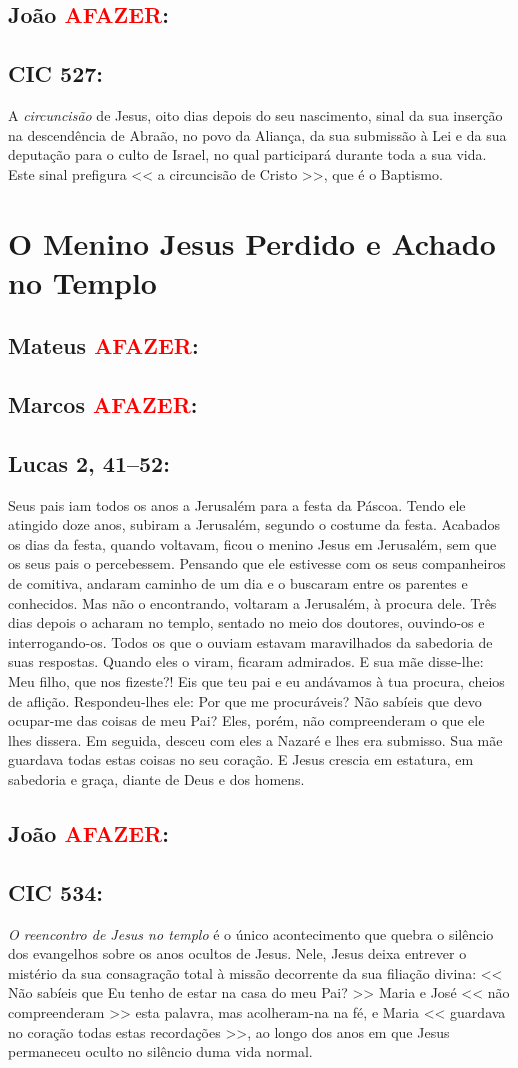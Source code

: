\documentclass[10pt,a5paper]{book}
\newcommand{\from}[1]{\subsection*{#1}}
\newcommand{\TODO}{\textcolor{red}{\ttfamily AFAZER}}
\begin{document}
\from{João \TODO:}

\from{CIC 527:}

A \emph{circuncisão} de Jesus, oito dias depois do seu nascimento, sinal da sua inserção na descendência de Abraão, no povo da Aliança, da sua submissão à Lei e da sua deputação para o culto de Israel, no qual participará durante toda a sua vida.
Este sinal prefigura << a circuncisão de Cristo >>, que é o Baptismo.


\section{O Menino Jesus Perdido e Achado no Templo}

\from{Mateus \TODO:}

\from{Marcos \TODO:}

\from{Lucas 2, 41--52:}

Seus pais iam todos os anos a Jerusalém para a festa da Páscoa.
Tendo ele atingido doze anos, subiram a Jerusalém, segundo o costume da festa.
Acabados os dias da festa, quando voltavam, ficou o menino Jesus em Jerusalém, sem que os seus pais o percebessem.
Pensando que ele estivesse com os seus companheiros de comitiva, andaram caminho de um dia e o buscaram entre os parentes e conhecidos.
Mas não o encontrando, voltaram a Jerusalém, à procura dele.
Três dias depois o acharam no templo, sentado no meio dos doutores, ouvindo-os e interrogando-os.
Todos os que o ouviam estavam maravilhados da sabedoria de suas respostas.
Quando eles o viram, ficaram admirados.
E sua mãe disse-lhe:
Meu filho, que nos fizeste?! Eis que teu pai e eu andávamos à tua procura, cheios de aflição.
Respondeu-lhes ele:
Por que me procuráveis? Não sabíeis que devo ocupar-me das coisas de meu Pai?
Eles, porém, não compreenderam o que ele lhes dissera.
Em seguida, desceu com eles a Nazaré e lhes era submisso.
Sua mãe guardava todas estas coisas no seu coração.
E Jesus crescia em estatura, em sabedoria e graça, diante de Deus e dos homens.

\from{João \TODO:}

\from{CIC 534:}

\emph{O reencontro de Jesus no templo} é o único acontecimento que quebra o silêncio dos evangelhos sobre os anos ocultos de Jesus.
Nele, Jesus deixa entrever o mistério da sua consagração total à missão decorrente da sua filiação divina:
<< Não sabíeis que Eu tenho de estar na casa do meu Pai? >>
Maria e José << não compreenderam >> esta palavra, mas acolheram-na na fé, e Maria << guardava no coração todas estas recordações >>, ao longo dos anos em que Jesus permaneceu oculto no silêncio duma vida normal.
\end{document}
